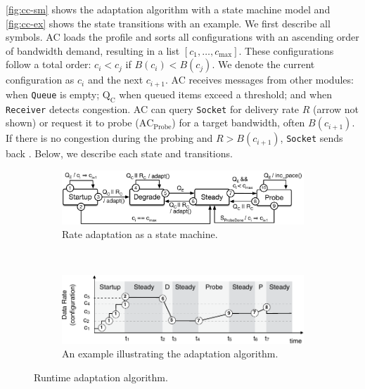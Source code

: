 \autoref{fig:cc-sm} shows the adaptation algorithm with a state machine model
and \autoref{fig:cc-ex} shows the state transitions with an example. We first
describe all symbols. AC loads the profile and sorts all configurations with an
ascending order of bandwidth demand, resulting in a list
$[c_1, \dots, c_{\max}]$.  These configurations follow a total order:
$c_i < c_j$ if $B(c_i) < B(c_j)$.  We denote the current configuration as $c_i$
and the next $c_{i+1}$.  AC receives messages from other modules: \qe{} when
\texttt{Queue} is empty; $\text{Q}_\text{C}$ when queued items exceed a
threshold; and \rc{} when \texttt{Receiver} detects congestion. AC can query
\texttt{Socket} for delivery rate $R$ (arrow not shown) or request it to probe
($\text{AC}_{\text{Probe}}$) for a target bandwidth, often $B(c_{i+1})$. If
there is no congestion during the probing and $R > B(c_{i+1})$, \texttt{Socket}
sends back \spd{}. Below, we describe each state and transitions.

\begin{figure}
  \begin{subfigure}[t]{\columnwidth}
    \centering
    \includegraphics[width=\columnwidth]{figures/cc.pdf}
    \caption{Rate adaptation as a state machine.}
    \label{fig:cc-sm}
  \end{subfigure}
  \vspace{0.5em}
  \\
  \centering
  \begin{subfigure}[t]{\columnwidth}
    \centering
    \includegraphics[width=0.9\columnwidth]{figures/cc2.pdf}
    \caption{An example illustrating the adaptation algorithm.}
    \label{fig:cc-ex}
  \end{subfigure}
  \caption{Runtime adaptation algorithm.}
  \label{fig:cc}
\end{figure}

